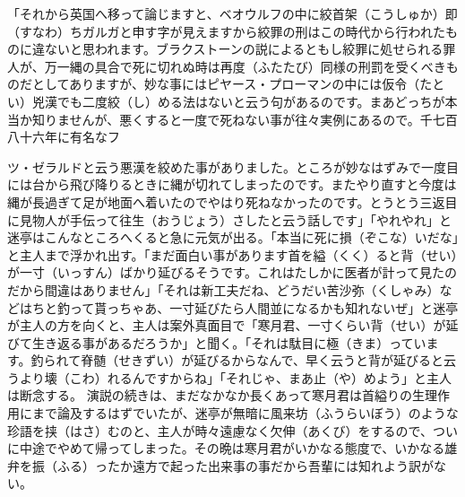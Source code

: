 \documentclass{book}
\begin{document}
「それから英国へ移って論じますと、ベオウルフの中に絞首架（こうしゅか）即（すなわ）ちガルガと申す字が見えますから絞罪の刑はこの時代から行われたものに違ないと思われます。ブラクストーンの説によるともし絞罪に処せられる罪人が、万一縄の具合で死に切れぬ時は再度（ふたたび）同様の刑罰を受くべきものだとしてありますが、妙な事にはピヤース・プローマンの中には仮令（たとい）兇漢でも二度絞（し）める法はないと云う句があるのです。まあどっちが本当か知りませんが、悪くすると一度で死ねない事が往々実例にあるので。千七百八十六年に有名なフ\begin{comment}\texttt{[image: ../../../gaiji/1-06/1-06-84.png]}\end{comment}ツ・ゼラルドと云う悪漢を絞めた事がありました。ところが妙なはずみで一度目には台から飛び降りるときに縄が切れてしまったのです。またやり直すと今度は縄が長過ぎて足が地面へ着いたのでやはり死ねなかったのです。とうとう三返目に見物人が手伝って往生（おうじょう）さしたと云う話しです」「やれやれ」と迷亭はこんなところへくると急に元気が出る。「本当に死に損（ぞこな）いだな」と主人まで浮かれ出す。「まだ面白い事があります首を縊（くく）ると背（せい）が一寸（いっすん）ばかり延びるそうです。これはたしかに医者が計って見たのだから間違はありません」「それは新工夫だね、どうだい苦沙弥（くしゃみ）などはちと釣って貰っちゃあ、一寸延びたら人間並になるかも知れないぜ」と迷亭が主人の方を向くと、主人は案外真面目で「寒月君、一寸くらい背（せい）が延びて生き返る事があるだろうか」と聞く。「それは駄目に極（きま）っています。釣られて脊髄（せきずい）が延びるからなんで、早く云うと背が延びると云うより壊（こわ）れるんですからね」「それじゃ、まあ止（や）めよう」と主人は断念する。
演説の続きは、まだなかなか長くあって寒月君は首縊りの生理作用にまで論及するはずでいたが、迷亭が無暗に風来坊（ふうらいぼう）のような珍語を挟（はさ）むのと、主人が時々遠慮なく欠伸（あくび）をするので、ついに中途でやめて帰ってしまった。その晩は寒月君がいかなる態度で、いかなる雄弁を振（ふる）ったか遠方で起った出来事の事だから吾輩には知れよう訳がない。
\end{document}
